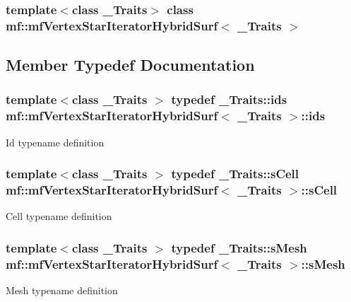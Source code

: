 \subsubsection*{template$<$class \_\-Traits$>$ class mf::mfVertexStarIteratorHybridSurf$<$ \_\-Traits $>$}



\subsection{Member Typedef Documentation}
\hypertarget{classmf_1_1mfVertexStarIteratorHybridSurf_a32d570ad58eb0990e038c4058730d16e}{
\subsubsection[{ids}]{\setlength{\rightskip}{0pt plus 5cm}template$<$class \_\-Traits $>$ typedef \_\-Traits::ids {\bf mf::mfVertexStarIteratorHybridSurf}$<$ \_\-Traits $>$::{\bf ids}}}
\label{classmf_1_1mfVertexStarIteratorHybridSurf_a32d570ad58eb0990e038c4058730d16e}
Id typename definition \hypertarget{classmf_1_1mfVertexStarIteratorHybridSurf_aae6c12237bca0c9f2b89ba3c4de79956}{
\subsubsection[{sCell}]{\setlength{\rightskip}{0pt plus 5cm}template$<$class \_\-Traits $>$ typedef \_\-Traits::sCell {\bf mf::mfVertexStarIteratorHybridSurf}$<$ \_\-Traits $>$::{\bf sCell}}}
\label{classmf_1_1mfVertexStarIteratorHybridSurf_aae6c12237bca0c9f2b89ba3c4de79956}
Cell typename definition \hypertarget{classmf_1_1mfVertexStarIteratorHybridSurf_a83c02395712edc51c7887c7256718c2c}{
\subsubsection[{sMesh}]{\setlength{\rightskip}{0pt plus 5cm}template$<$class \_\-Traits $>$ typedef \_\-Traits::sMesh {\bf mf::mfVertexStarIteratorHybridSurf}$<$ \_\-Traits $>$::{\bf sMesh}}}
\label{classmf_1_1mfVertexStarIteratorHybridSurf_a83c02395712edc51c7887c7256718c2c}
Mesh typename definition 

